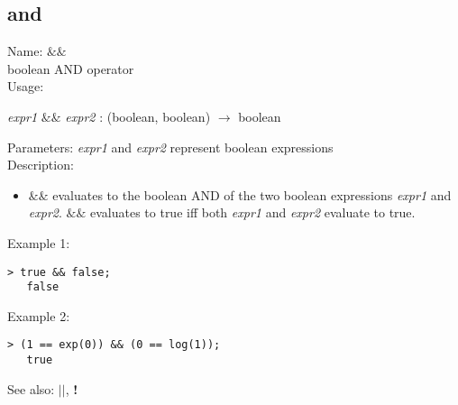 \subsection{ and }
\noindent Name: \textbf{$\&\&$}\\
boolean AND operator\\

\noindent Usage: 
\begin{center}
\emph{expr1} \textbf{$\&\&$} \emph{expr2} : (\textsf{boolean}, \textsf{boolean}) $\rightarrow$ \textsf{boolean}\\
\end{center}
Parameters: 
\emph{expr1} and \emph{expr2} represent boolean expressions\\

\noindent Description: \begin{itemize}

\item \textbf{$\&\&$} evaluates to the boolean AND of the two
   boolean expressions \emph{expr1} and \emph{expr2}. \textbf{$\&\&$} evaluates to 
   true iff both \emph{expr1} and \emph{expr2} evaluate to true.
\end{itemize}
\noindent Example 1: 
\begin{center}\begin{minipage}{14.8cm}\begin{Verbatim}[frame=single]
   > true && false;
   false
\end{Verbatim}
\end{minipage}\end{center}
\noindent Example 2: 
\begin{center}\begin{minipage}{14.8cm}\begin{Verbatim}[frame=single]
   > (1 == exp(0)) && (0 == log(1));
   true
\end{Verbatim}
\end{minipage}\end{center}
See also: \textbf{$||$}, \textbf{!}
